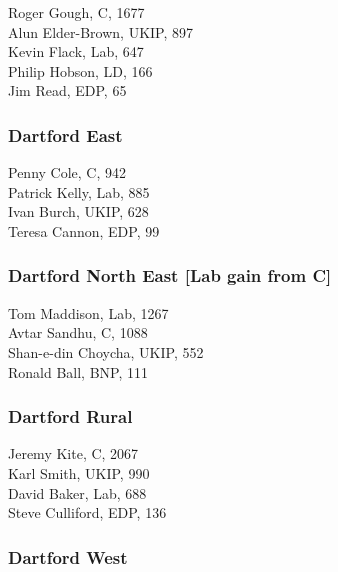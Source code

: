 \documentclass[a4paper,openany,10pt]{book}
\begin{document}


Roger Gough, C, 1677\\
Alun Elder-Brown, UKIP, 897\\
Kevin Flack, Lab, 647\\
Philip Hobson, LD, 166\\
Jim Read, EDP, 65\\


\subsubsection*{Dartford East}



Penny Cole, C, 942\\
Patrick Kelly, Lab, 885\\
Ivan Burch, UKIP, 628\\
Teresa Cannon, EDP, 99\\


\subsubsection*{Dartford North East \hspace*{\fill}\nolinebreak[1]%
\enspace\hspace*{\fill}
[Lab gain from C]}



Tom Maddison, Lab, 1267\\
Avtar Sandhu, C, 1088\\
Shan-e-din Choycha, UKIP, 552\\
Ronald Ball, BNP, 111\\


\subsubsection*{Dartford Rural}



Jeremy Kite, C, 2067\\
Karl Smith, UKIP, 990\\
David Baker, Lab, 688\\
Steve Culliford, EDP, 136\\


\subsubsection*{Dartford West}
\end{document}
